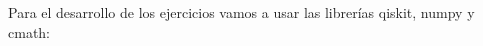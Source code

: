 \documentclass[11pt]{article}
\begin{document}

	Para el desarrollo de los ejercicios vamos a usar las librerías qiskit, numpy y cmath:
\end{document}
